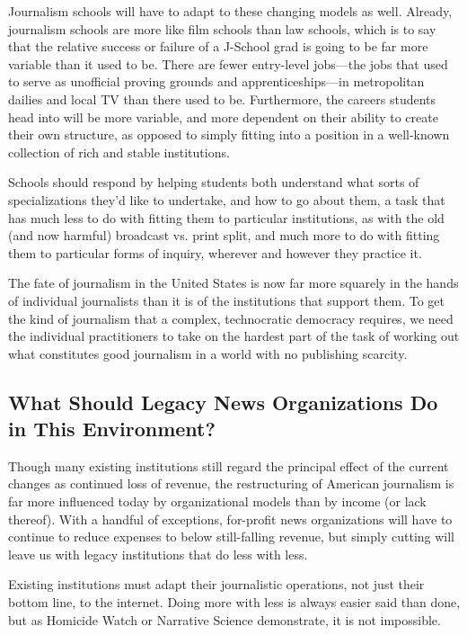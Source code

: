 Journalism schools will have to adapt to these changing models as well. Already,
journalism schools are more like film schools than law schools, which is to say
that the relative success or failure of a J-School grad is going to be far more variable
than it used to be. There are fewer entry-level jobs—the jobs that used to
serve as unofficial proving grounds and apprenticeships—in metropolitan dailies
and local TV than there used to be. Furthermore, the careers students head into
will be more variable, and more dependent on their ability to create their own
structure, as opposed to simply fitting into a position in a well-known collection
of rich and stable institutions.

Schools should respond by helping students both understand what sorts of specializations
they’d like to undertake, and how to go about them, a task that has
much less to do with fitting them to particular institutions, as with the old (and
now harmful) broadcast vs. print split, and much more to do with fitting them to
particular forms of inquiry, wherever and however they practice it.

The fate of journalism in the United States is now far more squarely in the hands
of individual journalists than it is of the institutions that support them. To get the
kind of journalism that a complex, technocratic democracy requires, we need
the individual practitioners to take on the hardest part of the task of working out
what constitutes good journalism in a world with no publishing scarcity.

\subsection{What Should Legacy News Organizations Do in This Environment?}

Though many existing institutions still regard the principal effect of the current
changes as continued loss of revenue, the restructuring of American journalism
is far more influenced today by organizational models than by income (or lack
thereof). With a handful of exceptions, for-profit news organizations will have
to continue to reduce expenses to below still-falling revenue, but simply cutting
will leave us with legacy institutions that do less with less.

Existing institutions must adapt their journalistic operations, not just their bottom
line, to the internet. Doing more with less is always easier said than done,
but as Homicide Watch or Narrative Science demonstrate, it is not impossible.

